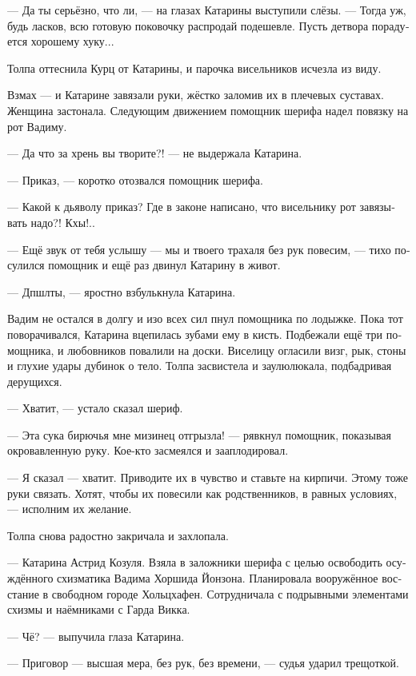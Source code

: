 \documentclass[a4paper,12pt,fleqn]{book}\usepackage{cooltooltips}\usepackage{polyglossia}\setdefaultlanguage[babelshorthands=true]{russian}\setotherlanguage{english}\defaultfontfeatures{Ligatures=TeX,Mapping=tex-text} \usepackage{xcolor}\definecolor{lightgray}{HTML}{bbbbbb}\color{lightgray}\newcommand{\ml}[3]{\textenglish{\textcolor{black}{#3}}}
\newcommand{\asterism}{\vspace{1em}{\centering\Large\bfseries$\ast~\ast~\ast$\par}\vspace{1em}}
\begin{document}
--- Да ты серьёзно, что ли, --- на глазах Катарины выступили слёзы.
--- Тогда уж, будь ласков, всю готовую поковочку распродай подешевле.
Пусть детвора порадуется хорошему хуку...

Толпа оттеснила Курц от Катарины, и парочка висельников исчезла из виду.

\asterism

Взмах --- и Катарине завязали руки, жёстко заломив их в плечевых суставах.
Женщина застонала.
Следующим движением помощник шерифа надел повязку на рот Вадиму.

--- Да что за хрень вы творите?! --- не выдержала Катарина.

--- Приказ, --- коротко отозвался помощник шерифа.

--- Какой к дьяволу приказ?
Где в законе написано, что висельнику рот завязывать надо?!
Кхы!..

--- Ещё звук от тебя услышу --- мы и твоего трахаля без рук повесим, --- тихо посулился помощник и ещё раз двинул Катарину в живот.

--- Дпшлты, --- яростно взбулькнула Катарина.

Вадим не остался в долгу и изо всех сил пнул помощника по лодыжке.
Пока тот поворачивался, Катарина вцепилась зубами ему в кисть.
Подбежали ещё три помощника, и любовников повалили на доски.
Виселицу огласили визг, рык, стоны и глухие удары дубинок о тело.
Толпа засвистела и заулюлюкала, подбадривая дерущихся.

--- Хватит, --- устало сказал шериф.

--- Эта сука бирючья мне мизинец отгрызла! --- рявкнул помощник, показывая окровавленную руку.
Кое-кто засмеялся и зааплодировал.

--- Я сказал --- хватит.
Приводите их в чувство и ставьте на кирпичи.
Этому тоже руки связать.
Хотят, чтобы их повесили как родственников, в равных условиях, --- исполним их желание.

Толпа снова радостно закричала и захлопала.

\asterism

--- Катарина Астрид Козуля.
Взяла в заложники шерифа с целью освободить осуждённого схизматика Вадима Хоршида Йонзона.
Планировала вооружённое восстание в свободном городе Хольцхафен.
Сотрудничала с подрывными элементами схизмы и наёмниками с Гарда Викка.

--- Чё? --- выпучила глаза Катарина.

--- Приговор --- высшая мера, без рук, без времени, --- судья ударил трещоткой.
\end{document}
